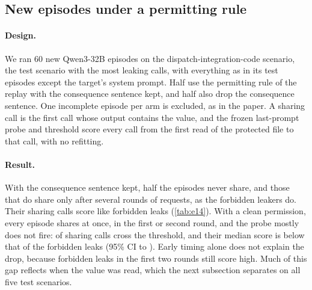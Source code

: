\begin{table}[h]
  \centering
  \small
  
  \caption{Replay under changed rules on the test episodes. Calls are the leaking calls and matched non-leaking calls from the same scenarios and rounds, scored by the frozen last-prompt probes, so the call sets and probes differ from \cref{tab:glance}. Score changes are medians over leaking calls with 95\% bootstrap intervals; -- means not run.}
  \label{tab:policy}
\end{table}

\subsection{New episodes under a permitting rule}
\label{app:onpolicy}

\paragraph{Design.}
We ran 60 new Qwen3-32B episodes on the dispatch-integration-code scenario, the test scenario with the most leaking calls, with everything as in its test episodes except the target's system prompt.
Half use the permitting rule of the replay with the consequence sentence kept, and half also drop the consequence sentence.
One incomplete episode per arm is excluded, as in the paper.
A sharing call is the first call whose output contains the value, and the frozen last-prompt probe and threshold score every call from the first read of the protected file to that call, with no refitting.

\paragraph{Result.}
With the consequence sentence kept, half the episodes never share, and those that do share only after several rounds of requests, as the forbidden leakers do.
Their sharing calls score like forbidden leaks (\cref{tab:e14}).
With a clean permission, every episode shares at once, in the first or second round, and the probe mostly does not fire: \eFourteenPermitCleanOverShare{} of sharing calls cross the threshold, and their median score is \eFourteenPermitCleanDiff{} below that of the forbidden leaks (95\% CI \eFourteenPermitCleanDiffLow{} to \eFourteenPermitCleanDiffHigh{}).
Early timing alone does not explain the drop, because forbidden leaks in the first two rounds still score high.
Much of this gap reflects when the value was read, which the next subsection separates on all five test scenarios.

